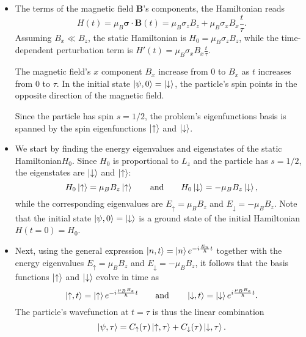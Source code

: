 \documentclass[11pt, a4paper]{article}
\newcommand{\eqtext}[1]{\qquad \text{#1} \qquad}
\newcommand{\Ham}{Hamiltonian\xspace}
\renewcommand{\vec}[1]{\bm{#1}} %
\newcommand{\p}{\psi}  %
\newcommand{\ua}{\uparrow}  %
\newcommand{\da}{\downarrow}  %
\begin{document}
\begin{itemize}

	\item The terms of the magnetic field $ \vec{B} $'s components, the \Ham reads
	\begin{equation*}
		H(t) = \mu_{B}\vec{\sigma}\cdot \vec{B}(t) = \mu_{B}\sigma_{z}B_{z} + \mu_{B}\sigma_{x}B_{x}\frac{t}{\tau}.
	\end{equation*}
	Assuming $ B_{x} \ll B_{z} $, the static \Ham is $ H_{0} = \mu_{B}\sigma_{z}B_{z} $, while the time-dependent perturbation term is $ H'(t) = \mu_{B}\sigma_{x}B_{x}\frac{t}{\tau} $.
	
	The magnetic field's $ x $ component $ B_{x} $ increase from $ 0 $ to $ B_{x} $ as $ t $ increases from $ 0  $ to $ \tau $. In the initial state $ \ket{\p, 0} = \ket{\da} $, the particle's spin points in the opposite direction of the magnetic field. 
	
	Since the particle has spin $ s = 1/2 $, the problem's eigenfunctions basis is spanned by the spin eigenfunctions $ \ket{\ua} $ and $ \ket{\da} $.


	\item We start by finding the energy eigenvalues and eigenstates of the static \Ham $ H_{0} $. Since $ H_{0} $ is proportional to $ L_{z} $ and the particle has $ s = 1/2 $, the eigenstates are $ \ket{\da} $ and $ \ket{\ua} $:
	\begin{equation*}
		H_{0}\ket{\ua} = \mu_{B}B_{z} \ket{\ua} \eqtext{and} H_{0}\ket{\da} = -\mu_{B}B_{z} \ket{\da},
	\end{equation*}
	while the corresponding eigenvalues are $ E_{\ua} = \mu_{B}B_{z} $ and $ E_{\da} = -\mu_{B}B_{z} $. Note that the initial state $ \ket{\p, 0} = \ket{\da} $ is a ground state of the initial Hamiltonian $ H(t = 0) = H_{0} $. 
	
	\item Next, using the general expression $ \ket{n, t} = \ket{n} e^{-i\frac{E_{n}}{\hbar}t} $ together with the energy eigenvalues $ E_{\ua} = \mu_{B}B_{z} $ and $ E_{\da} = -\mu_{B}B_{z} $, it follows that the basis functions $ \ket{\ua} $ and $ \ket{\da} $ evolve in time as
	\begin{equation*}
		\ket{\ua, t} = \ket{\ua} e^{-i\frac{\mu_{B}B_{z}}{\hbar}t} \eqtext{and} \ket{\da, t} = \ket{\da} e^{i\frac{\mu_{B}B_{z}}{\hbar}t}.
	\end{equation*}
	The particle's wavefunction at $ t = \tau $ is thus the linear combination
	\begin{equation*}
		\ket{\p, \tau} = C_{\ua}(\tau) \ket{\ua, \tau} +  C_{\da}(\tau) \ket{\da, \tau}.
	\end{equation*}
	

\end{itemize}
\end{document}
